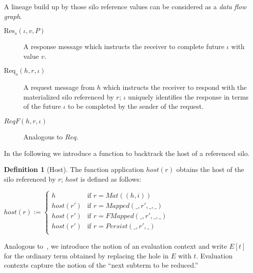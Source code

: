 \documentclass{article}
\theoremstyle{definition}
\newtheorem{defn}{Definition}[section]
\newcommand{\Req}[3]{\text{Req}_s(#1, #2, #3)}
\newcommand{\Res}[3]{\text{Res}_s(#1, #2, #3)}
\begin{document}
A lineage build up by those silo reference values can be considered as a {\emph{data flow graph}}\cite{???}. %

\begin{description}
\item[${\Res \iota v P}$] A response message which instructs the receiver to complete future $\iota$ with value $v$. %

\item[${\Req h r \iota}$] A request message from $h$ which instructs the receiver to respond with the materialized silo referenced by $r$; $\iota$ uniquely identifies the response in terms of the future $\iota$ to be completed by the sender of the request.

\item[$ReqF(h, r, \iota)$] Analogous to $Req$.
\end{description}

In the following we introduce a function to backtrack the host of a referenced silo.

\begin{defn}[Host]
  The function application $host(r)$ obtains the host of the silo referenced by $r$; $host$ is defined as follows:
  
  $host(r) := \begin{cases}
    h        & \text{if } r = Mat((h, i)) \\
    host(r') & \text{if } r = Mapped(\_, r', \_, \_) \\
    host(r') & \text{if } r = FMapped(\_, r', \_, \_) \\
    host(r') & \text{if } r = Persist(\_, r', \_) \\
    \end{cases}$
\end{defn}

Analogous to~\cite{TAPL}, we introduce the notion of an evaluation context and write $E[t]$ for the ordinary term obtained by replacing the hole in $E$ with $t$. Evaluation contexts capture the notion of the ``next subterm to be reduced.''
\end{document}
